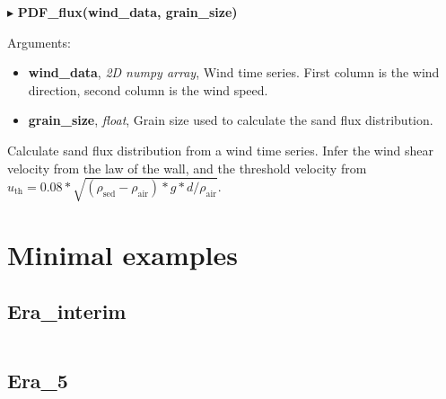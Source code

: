 \documentclass[12pt]{article}
\newenvironment{myenv}{\begin{adjustwidth}{2cm}{}}{\end{adjustwidth}}
\newcommand{\Function}[3]{\filbreak\noindent
$\blacktriangleright$ \quad\textbf{#1}
\begin{myenv}

Arguments: {#2}

{#3}
\end{myenv}
\vspace*{0.4 cm}}
\newcommand{\Argument}[3]{\noindent
\textbf{#1}, \textit{#2}, {#3}}
\begin{document}
\Function{PDF\_flux(wind\_data, grain\_size)}{
\begin{itemize}
	\item \Argument{wind\_data}{2D numpy array}{Wind time series. First column is the wind direction, second column is the wind speed.}
	\item \Argument{grain\_size}{float}{Grain size used to calculate the sand flux distribution.}
\end{itemize}
}{Calculate sand flux distribution from a wind time series. Infer the wind shear velocity from the law of the wall, and the threshold velocity from $u_{\textrm{th}} = 0.08 * \sqrt{(\rho_\textrm{sed}-\rho_\textrm{air})*g*d/\rho_\textrm{air}}$.}


\section{Minimal examples}
\subsection{Era\_interim}

\inputminted{python}{../Examples/example_Era_interim.py}

\subsection{Era\_5}

\inputminted{python}{../Examples/example_Era_5.py}
\end{document}
